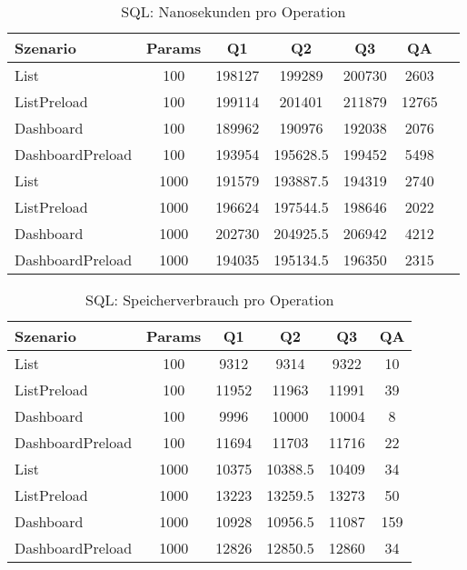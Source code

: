 
\begin{table}[ht]
\centering
\caption{SQL: Nanosekunden pro Operation}
\begin{tabular}{lcccccc}
\toprule
Szenario & Params & Q1 & Q2 & Q3 & QA \\
\midrule
	List & 100 & 198127 & 199289 & 200730 & 2603 \\
	ListPreload & 100 & 199114 & 201401 & 211879 & 12765 \\
	Dashboard & 100 & 189962 & 190976 & 192038 & 2076 \\
	DashboardPreload & 100 & 193954 & 195628.5 & 199452 & 5498 \\
	List & 1000 & 191579 & 193887.5 & 194319 & 2740 \\
	ListPreload & 1000 & 196624 & 197544.5 & 198646 & 2022 \\
	Dashboard & 1000 & 202730 & 204925.5 & 206942 & 4212 \\
	DashboardPreload & 1000 & 194035 & 195134.5 & 196350 & 2315 \\
\bottomrule
\end{tabular}
\label{tab:benchmark_sql_nsperop}
\end{table}
	
\begin{table}[ht]
\centering
\caption{SQL: Speicherverbrauch pro Operation}
\begin{tabular}{lccccc}
\toprule
Szenario & Params & Q1 & Q2 & Q3 & QA \\
\midrule
	List & 100 & 9312 & 9314 & 9322 & 10 \\
	ListPreload & 100 & 11952 & 11963 & 11991 & 39 \\
	Dashboard & 100 & 9996 & 10000 & 10004 & 8 \\
	DashboardPreload & 100 & 11694 & 11703 & 11716 & 22 \\
	List & 1000 & 10375 & 10388.5 & 10409 & 34 \\
	ListPreload & 1000 & 13223 & 13259.5 & 13273 & 50 \\
	Dashboard & 1000 & 10928 & 10956.5 & 11087 & 159 \\
	DashboardPreload & 1000 & 12826 & 12850.5 & 12860 & 34 \\
\bottomrule
\end{tabular}
\label{tab:benchmark_sql_bytesperop}
\end{table}
	
